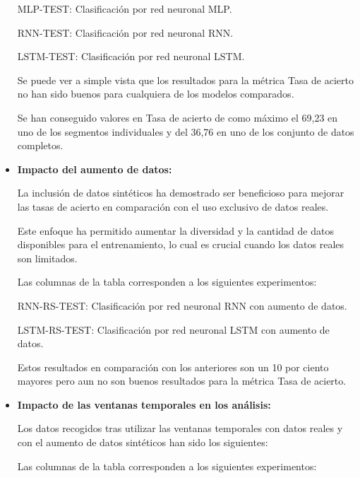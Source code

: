 \begin{itemize}
	MLP-TEST: Clasificación por red neuronal MLP.

	RNN-TEST: Clasificación por red neuronal RNN.

	LSTM-TEST: Clasificación por red neuronal LSTM.

	Se puede ver a simple vista que los resultados para la métrica Tasa de acierto no han sido buenos para cualquiera de los modelos comparados.

	Se han conseguido valores en Tasa de acierto de como máximo el 69,23 en uno de los segmentos individuales y del 36,76 en uno de los conjunto de datos completos.


	\item
	\textbf{Impacto del aumento de datos:}
	
	La inclusión de datos sintéticos ha demostrado ser beneficioso para mejorar las tasas de acierto en comparación con el uso exclusivo de datos reales. 
	
	Este enfoque ha permitido aumentar la diversidad y la cantidad de datos disponibles para el entrenamiento, lo cual es crucial cuando los datos reales son limitados.
	
	

	Las columnas de la tabla corresponden a los siguientes experimentos:

	RNN-RS-TEST: Clasificación por red neuronal RNN con aumento de datos.

	LSTM-RS-TEST: Clasificación por red neuronal LSTM con aumento de datos.

	Estos resultados en comparación con los anteriores son un 10 por ciento mayores pero aun no son buenos resultados para la métrica Tasa de acierto.
	

	\item
	\textbf{Impacto de las ventanas temporales en los análisis:}
	
	Los datos recogidos tras utilizar las ventanas temporales con datos reales y con el aumento de datos sintéticos han sido los siguientes:
	




	Las columnas de la tabla corresponden a los siguientes experimentos:


\end{itemize}
